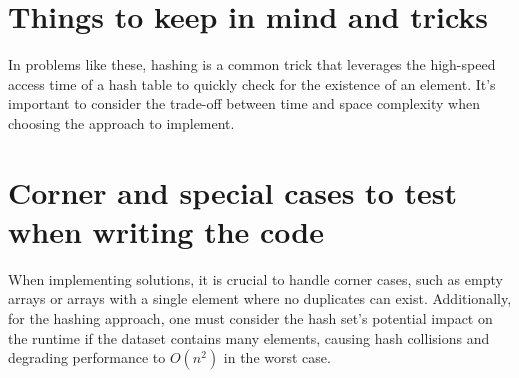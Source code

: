 \section*{Things to keep in mind and tricks}
In problems like these, hashing is a common trick that leverages the high-speed access time of a hash table to quickly check for the existence of an element. It's important to consider the trade-off between time and space complexity when choosing the approach to implement.

\section*{Corner and special cases to test when writing the code}
When implementing solutions, it is crucial to handle corner cases, such as empty arrays or arrays with a single element where no duplicates can exist. Additionally, for the hashing approach, one must consider the hash set's potential impact on the runtime if the dataset contains many elements, causing hash collisions and degrading performance to \(O(n^2)\) in the worst case.